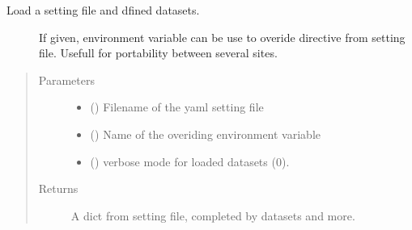 \documentclass[letterpaper,10pt,english]{sphinxmanual}
\begin{document}
\begin{fulllineitems}
\label{\detokenize{pyterk:pyterk.config.load}}\begin{description}
\item[{Load a setting file and dfined datasets.}] \leavevmode
\sphinxAtStartPar
If given, environment variable can be use to overide  directive from setting file.
Usefull for portability between several sites.

\end{description}
\begin{quote}\begin{description}
\item[{Parameters}] \leavevmode\begin{itemize}
\item {} 
\sphinxAtStartPar
{} () \textendash{} Filename of the yaml setting file

\item {} 
\sphinxAtStartPar
{} () \textendash{} Name of the overiding environment variable

\item {} 
\sphinxAtStartPar
{} () \textendash{} verbose mode for loaded datasets (0).

\end{itemize}

\item[{Returns}] \leavevmode
\sphinxAtStartPar
A dict from setting file, completed by datasets and more.

\end{description}\end{quote}

\end{fulllineitems}

\end{document}
